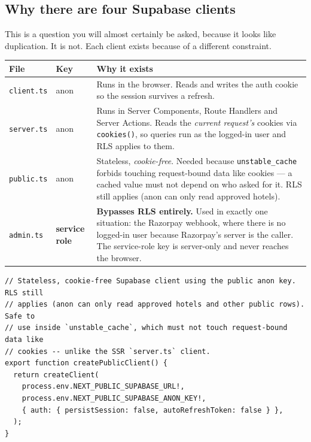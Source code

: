 \documentclass[11pt,a4paper]{article}
\newcommand{\file}[1]{\texttt{\small #1}}
\begin{document}
\subsection{Why there are four Supabase clients}
\label{sec:fourclients}

This is a question you will almost certainly be asked, because it looks like
duplication. It is not. Each client exists because of a different constraint.

\begin{longtable}{@{}p{2.8cm}p{2.1cm}p{9.6cm}@{}}
\toprule
\textbf{File} & \textbf{Key} & \textbf{Why it exists} \\
\midrule
\endhead
\file{client.ts} & anon & Runs in the browser. Reads and writes the auth cookie
so the session survives a refresh. \\
\addlinespace
\file{server.ts} & anon & Runs in Server Components, Route Handlers and Server
Actions. Reads the \emph{current request's} cookies via \texttt{cookies()}, so
queries run as the logged-in user and RLS applies to them. \\
\addlinespace
\file{public.ts} & anon & Stateless, \emph{cookie-free}. Needed because
\texttt{unstable\_cache} forbids touching request-bound data like cookies --- a
cached value must not depend on who asked for it. RLS still applies (anon can
only read approved hotels). \\
\addlinespace
\file{admin.ts} & \textbf{service role} & \textbf{Bypasses RLS entirely.} Used in
exactly one situation: the Razorpay webhook, where there is no logged-in user
because Razorpay's server is the caller. The service-role key is server-only and
never reaches the browser. \\
\bottomrule
\end{longtable}

\begin{lstlisting}[language=TS,caption={lib/supabase/public.ts --- read the comment; it is the whole justification}]
// Stateless, cookie-free Supabase client using the public anon key. RLS still
// applies (anon can only read approved hotels and other public rows). Safe to
// use inside `unstable_cache`, which must not touch request-bound data like
// cookies -- unlike the SSR `server.ts` client.
export function createPublicClient() {
  return createClient(
    process.env.NEXT_PUBLIC_SUPABASE_URL!,
    process.env.NEXT_PUBLIC_SUPABASE_ANON_KEY!,
    { auth: { persistSession: false, autoRefreshToken: false } },
  );
}
\end{lstlisting}
\end{document}
